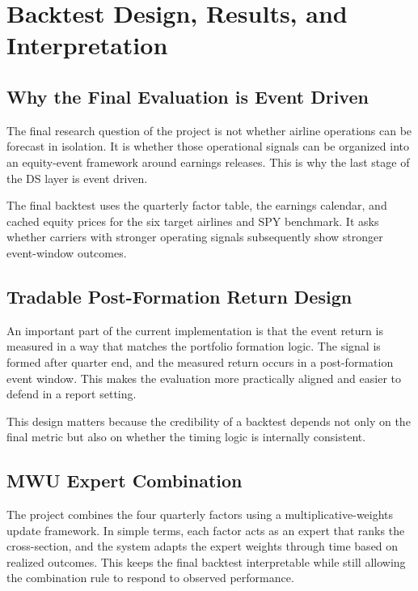 \documentclass[11pt,a4paper]{article}
\begin{document}
\section{Backtest Design, Results, and Interpretation}

\subsection{Why the Final Evaluation is Event Driven}

The final research question of the project is not whether airline operations
can be forecast in isolation. It is whether those operational signals can be
organized into an equity-event framework around earnings releases. This is why
the last stage of the DS layer is event driven.

The final backtest uses the quarterly factor table, the earnings calendar, and
cached equity prices for the six target airlines and SPY benchmark. It asks
whether carriers with stronger operating signals subsequently show stronger
event-window outcomes.

\subsection{Tradable Post-Formation Return Design}

An important part of the current implementation is that the event return is
measured in a way that matches the portfolio formation logic. The signal is
formed after quarter end, and the measured return occurs in a post-formation
event window. This makes the evaluation more practically aligned and easier to
defend in a report setting.

This design matters because the credibility of a backtest depends not only on
the final metric but also on whether the timing logic is internally consistent.

\subsection{MWU Expert Combination}

The project combines the four quarterly factors using a multiplicative-weights
update framework. In simple terms, each factor acts as an expert that ranks the
cross-section, and the system adapts the expert weights through time based on
realized outcomes. This keeps the final backtest interpretable while still
allowing the combination rule to respond to observed performance.
\end{document}
